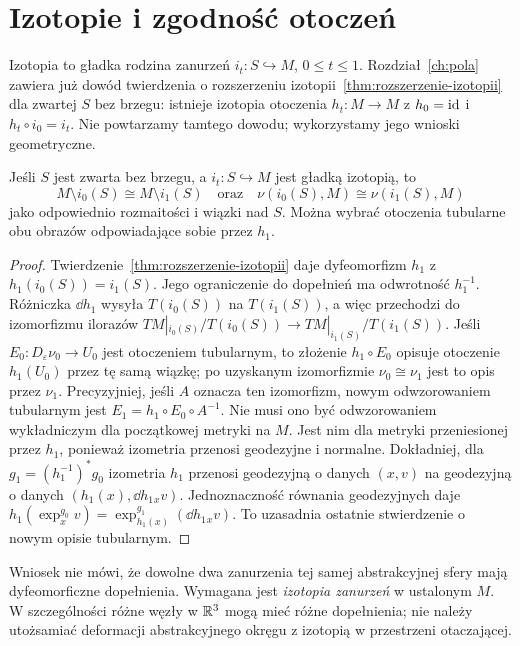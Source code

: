 \section{Izotopie i zgodność otoczeń}
\label{sec:izotopie-otoczen-15}

Izotopia to gładka rodzina zanurzeń
$i_t:S\hookrightarrow M$, $0\leq t\leq1$.
Rozdział~\ref{ch:pola} zawiera
już dowód twierdzenia o rozszerzeniu
izotopii~\ref{thm:rozszerzenie-izotopii}
dla zwartej $S$ bez brzegu:
istnieje izotopia otoczenia
$h_t:M\to M$ z $h_0=\mathrm{id}$
i $h_t\circ i_0=i_t$.
Nie powtarzamy tamtego dowodu;
wykorzystamy jego wnioski geometryczne.

\begin{wniosek}
\label{cor:izotopia-dopelnienia}
Jeśli $S$ jest zwarta bez brzegu,
a $i_t:S\hookrightarrow M$ jest
gładką izotopią, to
\[
 M\setminus i_0(S)\cong M\setminus i_1(S)
 \quad\text{oraz}\quad
 \nu(i_0(S),M)\cong \nu(i_1(S),M)
\]
jako odpowiednio rozmaitości
i wiązki nad $S$. Można wybrać
otoczenia tubularne obu obrazów
odpowiadające sobie przez $h_1$.
\end{wniosek}
\begin{proof}
Twierdzenie~\ref{thm:rozszerzenie-izotopii}
daje dyfeomorfizm $h_1$ z
$h_1(i_0(S))=i_1(S)$.
Jego ograniczenie do dopełnień
ma odwrotność $h_1^{-1}$.
Różniczka $\dd h_1$ wysyła
$T(i_0(S))$ na $T(i_1(S))$,
a więc przechodzi do
izomorfizmu ilorazów
$TM|_{i_0(S)}/T(i_0(S))
\to TM|_{i_1(S)}/T(i_1(S))$.
Jeśli $E_0:D_\varepsilon\nu_0\to U_0$
jest otoczeniem tubularnym,
to złożenie $h_1\circ E_0$
opisuje otoczenie $h_1(U_0)$
przez tę samą wiązkę; po
uzyskanym izomorfizmie $\nu_0\cong\nu_1$
jest to opis przez $\nu_1$. Precyzyjniej, jeśli $A$
oznacza ten izomorfizm, nowym odwzorowaniem tubularnym jest
$E_1=h_1\circ E_0\circ A^{-1}$. Nie musi ono być
odwzorowaniem wykładniczym dla początkowej metryki na $M$.
Jest nim dla metryki przeniesionej przez $h_1$,
ponieważ izometria przenosi geodezyjne i normalne.
Dokładniej, dla $g_1=(h_1^{-1})^*g_0$ izometria $h_1$
przenosi geodezyjną o danych $(x,v)$ na geodezyjną
o danych $(h_1(x),\dd h_1{}_xv)$.
Jednoznaczność równania geodezyjnych daje
$h_1(\exp_x^{g_0}v)
=\exp_{h_1(x)}^{g_1}(\dd h_1{}_xv)$.
To uzasadnia ostatnie stwierdzenie o nowym opisie tubularnym.
\end{proof}

\begin{uwaga}
Wniosek nie mówi, że dowolne dwa
zanurzenia tej samej abstrakcyjnej
sfery mają dyfeomorficzne dopełnienia.
Wymagana jest \emph{izotopia zanurzeń}
w ustalonym $M$. W szczególności
różne węzły w $\mathbb{R}^3$ mogą mieć
różne dopełnienia; nie należy
utożsamiać deformacji abstrakcyjnego
okręgu z izotopią w przestrzeni
otaczającej.
\end{uwaga}


